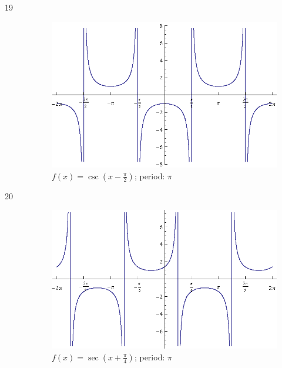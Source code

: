 \documentclass{exam}
\begin{document}
\begin{description}
      \item[19]
        \begin{figure}[H]
          \centering
          \includegraphics[scale=0.9]{exercise19.eps}
          \caption{$f(x) = \csc \left( x - \frac{\pi}{2} \right)$; period: $\pi$}
        \end{figure}

      \item[20]
        \begin{figure}[H]
          \centering
          \includegraphics[scale=0.9]{exercise20.eps}
          \caption{$f(x) = \sec \left( x + \frac{\pi}{4} \right)$; period: $\pi$}
        \end{figure}


\end{description}
\end{document}
